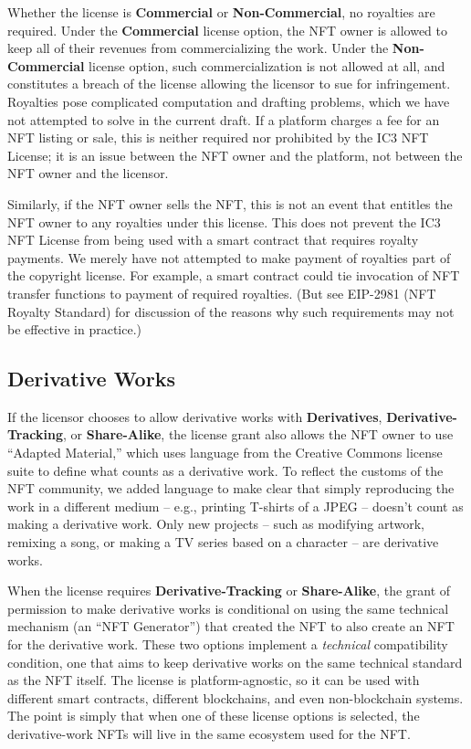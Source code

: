\documentclass{article}
\newcommand{\iccclicense}{IC3 NFT License\xspace}
\newcommand{\keyword}[1]{\textbf{#1}\xspace}
\newcommand{\commercial}{\keyword{Commercial}}
\newcommand{\noncommercial}{\keyword{Non-Commercial}}
\newcommand{\derivative}{\keyword{Derivatives}}
\newcommand{\sharealike}{\keyword{Share-Alike}}
\newcommand{\derivativetracking}{\keyword{Derivative-Tracking}}
\begin{document}
Whether the license is \commercial or \noncommercial, no royalties are required. Under the \commercial license option, the NFT owner is allowed to keep all of their revenues from commercializing the work. Under the \noncommercial license option, such commercialization is not allowed at all, and constitutes a breach of the license allowing the licensor to sue for infringement. Royalties pose complicated computation and drafting problems, which we have not attempted to solve in the current draft. If a platform charges a fee for an NFT listing or sale, this is neither required nor prohibited by the \iccclicense; it is an issue between the NFT owner and the platform, not between the NFT owner and the licensor.  

Similarly, if the NFT owner sells the NFT, this is not an event that entitles the NFT owner to any royalties under this license.  This does not prevent the \iccclicense from being used with a smart contract that requires royalty payments. We merely have not attempted to make payment of royalties part of the copyright license. For example, a smart contract could tie invocation of NFT transfer functions to payment of required royalties. (But see EIP-2981 (NFT Royalty Standard) for discussion of the reasons why such requirements may not  be effective in practice.) 

\subsection{Derivative Works}

If the licensor chooses to allow derivative works with \derivative, \derivativetracking, or \sharealike, the license grant also allows the NFT owner to use ``Adapted Material,'' which uses language from the Creative Commons license suite to define what counts as a derivative work. To reflect the customs of the NFT community, we added language to make clear that simply reproducing the work in a different medium -- e.g., printing T-shirts of a JPEG -- doesn't count as making a derivative work. Only new projects -- such as modifying artwork, remixing a song, or making a TV series based on a character -- are derivative works.

When the license requires \derivativetracking or \sharealike, the grant of permission to make derivative works is conditional on using the same technical mechanism (an ``NFT Generator'') that created the NFT to also create an NFT for the derivative work. These two options implement a \emph{technical} compatibility condition, one that aims to keep derivative works on the same technical standard as the NFT itself. The license is platform-agnostic, so it can be used with different smart contracts, different blockchains, and even non-blockchain systems. The point is simply that when one of these license options is selected, the derivative-work NFTs will live in the same ecosystem used for the NFT.
\end{document}
